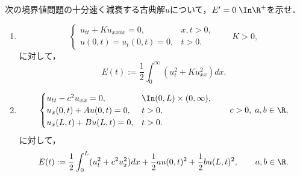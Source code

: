 \documentclass[uplatex,dvipdfmx]{jsarticle}
\begin{document}
\begin{problem}
    次の境界値問題の十分速く減衰する古典解$u$について，$E'=0\;\In\R^+$を示せ．
    \begin{enumerate}
        \item \[\begin{cases}
            u_{tt}+Ku_{xxxx}=0,&x,t>0,\\
            u(0,t)=u_t(0,t)=0,&t>0.
        \end{cases}\qquad K>0,\]
        に対して，
        \[E(t):=\frac{1}{2}\int^\infty_0(u_t^2+Ku^2_{xx})dx.\]
        \item \[\begin{cases}
            u_{tt}-c^2u_{xx}=0,&\In(0,L)\times(0,\infty),\\
            u_x(0,t)+Au(0,t)=0,&t>0,\\
            u_x(L,t)+Bu(L,t)=0,&t>0.
        \end{cases}\qquad c>0,\;a,b\in\R,\]
        に対して，
        \[E(t):=\frac{1}{2}\int^L_0(u^2_t+c^2u_x^2)dx+\frac{1}{2}au(0,t)^2+\frac{1}{2}bu(L,t)^2,\qquad a,b\in\R.\]
    \end{enumerate}
\end{problem}
\end{document}
